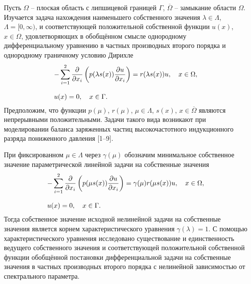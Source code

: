 
\vzmscaption

Пусть
$\Omega$ -- плоская область с липшицевой границей $\Gamma$,
$\overline{\Omega}$ -- замыкание области $\Omega$.
Изучается задача нахождения наименьшего собственного
значения ${\lambda\in\Lambda}$, ${\Lambda=[0,\infty)}$, и соответствующей
положительной собственной функции $u(x)$, ${x\in\Omega}$,
удовлетворяющих в обобщённом смысле однородному
дифференциальному уравнению
в частных производных
второго порядка и
однородному граничному условию Дирихле
\begin{equation*}
\begin{array}{l}
\displaystyle
-\sum_{i=1}^{2}\frac{\partial}{\partial x_i}\left(p(\lambda s(x))\frac{\partial u}{\partial x_i}\right)=
r(\lambda s(x))u,\quad
x\in\Omega,
\bigskip
\\
\displaystyle
u(x)=0,\quad
x\in\Gamma.
\end{array}
\label{sol_f1}
\end{equation*}
Предположим, что функции
$p(\mu)$,
$r(\mu)$, $\mu\in\Lambda$,
$s(x)$, $x\in\overline{\Omega}$
являются непрерывными положительными.
Задачи такого вида возникают при моделировании баланса заряженных частиц
высокочастотного индукционного разряда
пониженного давления
[1--9].

При фиксированном $\mu\in\Lambda$
через $\gamma(\mu)$ обозначим
минимальное собственное значение
параметрической линейной задачи на собственные значения
\begin{equation*}
\begin{array}{l}
\displaystyle
-\sum_{i=1}^{2}\frac{\partial}{\partial x_i}
\left(p(\mu s(x))\frac{\partial u}{\partial x_i}\right)=
\gamma(\mu)
r(\mu s(x))u,\quad
x\in\Omega,
\bigskip
\\
\displaystyle
u(x)=0,\quad
x\in\Gamma.
\end{array}
\label{sol_f1}
\end{equation*}
Тогда собственное значение исходной нелинейной задачи на собственные значения
является корнем характеристического уравнения
$\gamma(\lambda)=1.$
С помощью характеристического уравнения исследовано существование
и единственность
ведущего собственного значения и
соответствующей положительной собственной функции
обобщённой постановки
дифференциальной задачи на собственные значения
в частных производных
второго порядка
с нелинейной зависимостью от спектрального параметра.

